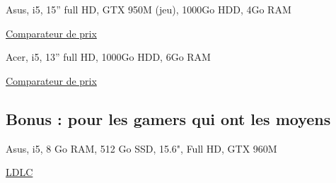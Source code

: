 \documentclass{ki}
\begin{document}
Asus, i5, 15” full HD, GTX 950M (jeu), 1000Go HDD, 4Go RAM

\href{http://www.prix-portables.fr/PC%20portable/19389/Asus,K501lx-dm200t.html}{Comparateur de prix}

Acer, i5, 13” full HD, 1000Go HDD, 6Go RAM

\href{http://www.prix-portables.fr/PC%20portable/19773/Acer,Aspire-v3-372-50aw-blanc.html}{Comparateur de prix}

\subsection{Bonus : pour les gamers qui ont les moyens}

Asus, i5, 8 Go RAM, 512 Go SSD, 15.6", Full HD, GTX 960M

\href{http://www.ldlc.com/fiche/PB00212704.html}{LDLC}
\end{document}
